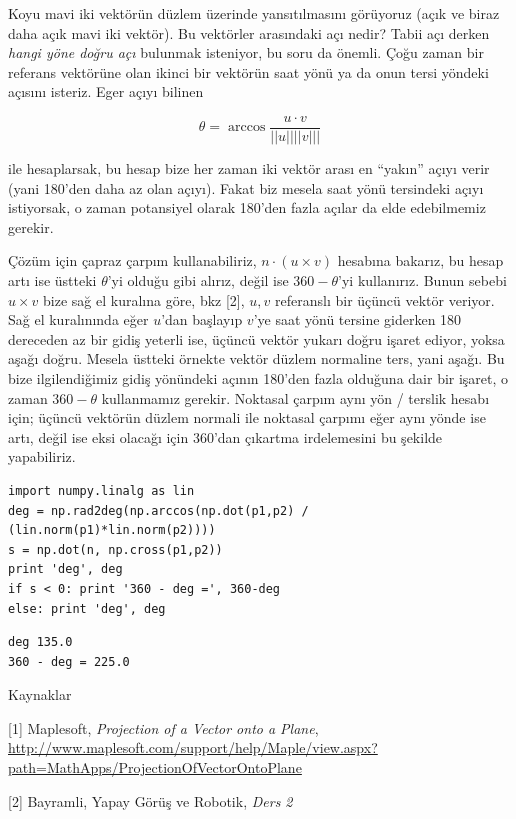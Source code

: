 \documentclass[12pt,fleqn]{article}\usepackage{../../common}
\begin{document}
Koyu mavi iki vektörün düzlem üzerinde yansıtılmasını görüyoruz (açık ve
biraz daha açık mavi iki vektör). Bu vektörler arasındaki açı nedir? Tabii
açı derken {\em hangi yöne doğru açı} bulunmak isteniyor, bu soru da
önemli. Çoğu zaman bir referans vektörüne olan ikinci bir vektörün saat
yönü ya da onun tersi yöndeki açısını isteriz. Eger açıyı bilinen

$$ \theta = \arccos \frac{u \cdot v}{||u||||v|||}$$

ile hesaplarsak, bu hesap bize her zaman iki vektör arası en ``yakın''
açıyı verir (yani 180'den daha az olan açıyı). Fakat biz mesela saat yönü
tersindeki açıyı istiyorsak, o zaman potansiyel olarak 180'den fazla açılar
da elde edebilmemiz gerekir.

Çözüm için çapraz çarpım kullanabiliriz, $n \cdot (u \times v)$ hesabına
bakarız, bu hesap artı ise üstteki $\theta$'yi olduğu gibi alırız, değil
ise $360-\theta$'yi kullanırız. Bunun sebebi $u \times v$ bize sağ el
kuralına göre, bkz [2], $u,v$ referanslı bir üçüncü vektör veriyor. Sağ el
kuralınında eğer $u$'dan başlayıp $v$'ye saat yönü tersine giderken 180
dereceden az bir gidiş yeterli ise, üçüncü vektör yukarı doğru işaret
ediyor, yoksa aşağı doğru. Mesela üstteki örnekte vektör düzlem normaline
ters, yani aşağı. Bu bize ilgilendiğimiz gidiş yönündeki açının 180'den
fazla olduğuna dair bir işaret, o zaman $360 - \theta$ kullanmamız
gerekir. Noktasal çarpım aynı yön / terslik hesabı için; üçüncü vektörün
düzlem normali ile noktasal çarpımı eğer aynı yönde ise artı, değil ise
eksi olacağı için 360'dan çıkartma irdelemesini bu şekilde yapabiliriz.

\begin{verbatim}
import numpy.linalg as lin
deg = np.rad2deg(np.arccos(np.dot(p1,p2) / (lin.norm(p1)*lin.norm(p2))))
s = np.dot(n, np.cross(p1,p2))
print 'deg', deg
if s < 0: print '360 - deg =', 360-deg
else: print 'deg', deg
\end{verbatim}

\begin{verbatim}
deg 135.0
360 - deg = 225.0
\end{verbatim}

Kaynaklar

[1] Maplesoft, {\em Projection of a Vector onto a Plane}, \url{http://www.maplesoft.com/support/help/Maple/view.aspx?path=MathApps/ProjectionOfVectorOntoPlane}

[2] Bayramli, Yapay Görüş ve Robotik, {\em Ders 2}
\end{document}
